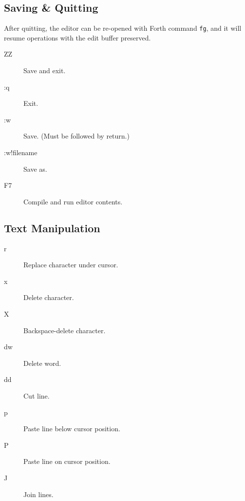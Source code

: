 \subsection{Saving \& Quitting}

After quitting, the editor can be re-opened with Forth command \texttt{fg}, and it will resume operations with the edit buffer preserved.

\begin{description}
\item[ZZ] Save and exit.
\item[:q] Exit.
\item[:w] Save. (Must be followed by return.)
\item[:w!filename] Save as.
\item[F7] Compile and run editor contents.
\end{description}

\subsection{Text Manipulation}
\begin{description}
\item[r] Replace character under cursor.
\item[x] Delete character.
\item[X] Backspace-delete character.
\item[dw] Delete word.
\item[dd] Cut line.
\item[p] Paste line below cursor position.
\item[P] Paste line on cursor position.
\item[J] Join lines.
\end{description}
